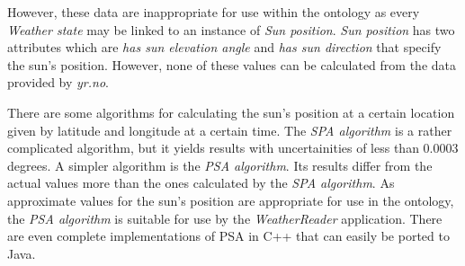 However, these data are inappropriate for use within the \thinkhomeweather ontology as every \emph{Weather state} may be linked to an instance of \emph{Sun position}. \emph{Sun position} has two attributes which are \emph{has sun elevation angle} and \emph{has sun direction} that specify the sun's position. However, none of these values can be calculated from the data provided by \emph{yr.no}.

There are some algorithms for calculating the sun's position at a certain location given by latitude and longitude at a certain time. The \emph{SPA algorithm} is a rather complicated algorithm, but it yields results with uncertainities of less than 0.0003 degrees. A simpler algorithm is the \emph{PSA algorithm}. Its results differ from the actual values more than the ones calculated by the \emph{SPA algorithm}. As approximate values for the sun's position are appropriate for use in the \thinkhomeweather ontology, the \emph{PSA algorithm} is suitable for use by the \emph{WeatherReader} application. There are even complete implementations of PSA in C++ that can easily be ported to Java.

